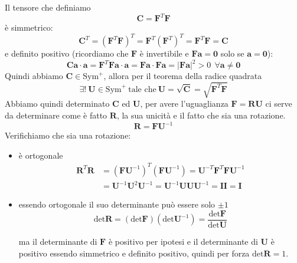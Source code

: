 \documentclass[10pt,a4paper,twoside]{book}
\begin{document}
Il tensore che definiamo
\begin{equation*}
\boxed{\mathbf{C} =\mathbf{F}^{T}\mathbf{F}}
\end{equation*}
è simmetrico:
\begin{equation*}
\mathbf{C}^{T} =\left(\mathbf{F}^{T}\mathbf{F}\right)^{T} =\mathbf{F}^{T}\left(\mathbf{F}^{T}\right)^{T} =\mathbf{F}^{T}\mathbf{F} =\mathbf{C}
\end{equation*}
e definito positivo (ricordiamo che $\mathbf{F}$ è invertibile e $\mathbf{Fa} =\mathbf{0}$ solo se $\mathbf{a} =\mathbf{0}$):
\begin{equation*}
\mathbf{Ca} \cdotp \mathbf{a} =\mathbf{F}^{T}\mathbf{Fa} \cdotp \mathbf{a} =\mathbf{Fa} \cdotp \mathbf{Fa} =| \mathbf{Fa}| ^{2}  >0\ \ \forall \mathbf{a} \neq \mathbf{0}
\end{equation*}
Quindi abbiamo $\mathbf{C} \in \mathrm{Sym}^{+}$, allora per il teorema della radice quadrata
\begin{equation*}
\exists !\ \mathbf{U} \in \mathrm{Sym}^{+} \ \text{tale che} \ \boxed{\mathbf{U} =\sqrt{\mathbf{C}} =\sqrt{\mathbf{F}^{T}\mathbf{F}}}
\end{equation*}
Abbiamo quindi determinato $\mathbf{C}$ ed $\mathbf{U}$, per avere l'uguaglianza $\mathbf{F} =\mathbf{RU}$ ci serve da determinare come è fatto $\mathbf{R}$, la sua unicità e il fatto che sia una rotazione.
\begin{equation*}
\boxed{\mathbf{R} =\mathbf{FU}^{-1}}
\end{equation*}
Verifichiamo che sia una rotazione:
\begin{itemize}
\item è ortogonale\begin{align*}
\mathbf{R}^{T}\mathbf{R} & =\left(\mathbf{FU}^{-1}\right)^{T}\left(\mathbf{FU}^{-1}\right) =\mathbf{U}^{-T}\mathbf{F}^{T}\mathbf{FU}^{-1}\\
 & =\mathbf{U}^{-1}\mathbf{U}^{2}\mathbf{U}^{-1} =\mathbf{U}^{-1}\mathbf{UUU}^{-1} =\mathbf{II} =\mathbf{I}
\end{align*}
\item essendo ortogonale il suo determinante può essere solo $\pm 1$\begin{equation*}
\mathrm{det}\mathbf{R} =(\mathrm{det}\mathbf{F})\left(\mathrm{det}\mathbf{U}^{-1}\right) =\frac{\mathrm{det}\mathbf{F}}{\mathrm{det}\mathbf{U}}
\end{equation*}

ma il determinante di $\mathbf{F}$ è positivo per ipotesi e il determinante di $\mathbf{U}$ è positivo essendo simmetrico e definito positivo, quindi per forza $\mathrm{det}\mathbf{R} =1$.
\end{itemize}
\end{document}
